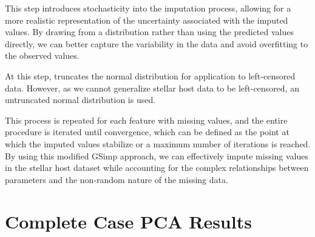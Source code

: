 \documentclass[preprint]{aastex631}
\begin{document}
This step introduces stochasticity into the imputation process, allowing for a more realistic representation of the uncertainty associated with the imputed values. By drawing from a distribution rather than using the predicted values directly, we can better capture the variability in the data and avoid overfitting to the observed values.

At this step, \citet{weiGSimpGibbsSampler2018} truncates the normal distribution for application to left-censored data. However, as we cannot generalize stellar host data to be left-censored, an untruncated normal distribution is used.

This process is repeated for each feature with missing values, and the entire procedure is iterated until convergence, which can be defined as the point at which the imputed values stabilize or a maximum number of iterations is reached. By using this modified GSimp approach, we can effectively impute missing values in the stellar host dataset while accounting for the complex relationships between parameters and the non-random nature of the missing data.

\appendix
\section[Appendix A]{Complete Case PCA Results}
\label{sec:appendix_a}
\end{document}

